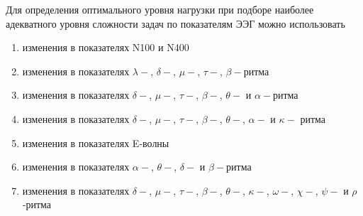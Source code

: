 
Для определения оптимального уровня нагрузки при подборе наиболее адекватного уровня сложности задач по показателям ЭЭГ можно использовать  

\begin{enumerate}
    \item изменения в показателях N100 и N400
    \item изменения в показателях $\lambda-$,  $\delta-$, $\mu-$, $\tau-$,  $\beta-$ритма
    \item изменения в показателях  $\delta-$, $\mu-$,  $\tau-$,  $\beta-$,  $\theta-$ и $\alpha-$ритма
    \item изменения в показателях  $\delta-$, $\mu-$,  $\tau-$, $\beta-$,  $\theta-$, $\alpha-$ и  $\kappa-$ ритма
    \item изменения в показателях E-волны
    \item изменения в показателях  $\alpha-$,  $\theta-$,  $\delta-$ и $\beta-$ритма
    \item изменения в показателях  $\delta-$, $\mu-$, $\tau-$,  $\beta-$,  $\theta-$,  $\kappa-$,  $\omega-$,  $\chi-$,  $\psi-$ и  $\rho$-ритма
\end{enumerate}